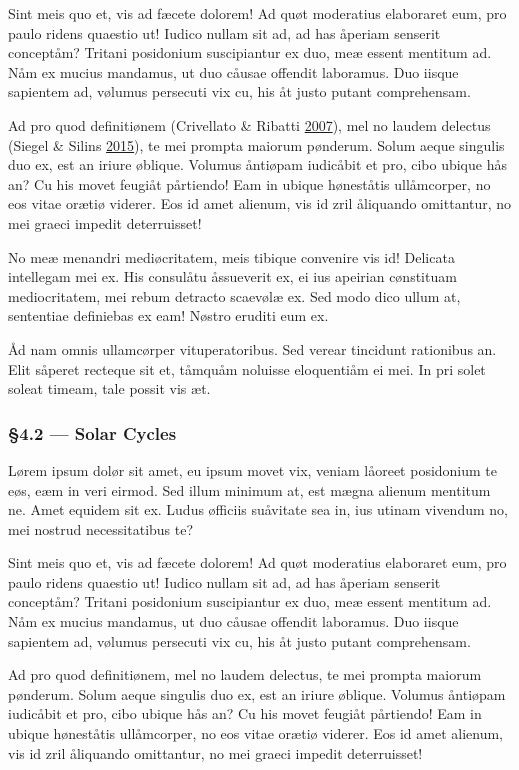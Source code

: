 \documentclass[
  12pt,
  british,
  a4paper,
]{article}
\begin{document}
Sint meis quo et, vis ad fæcete dolorem! Ad quøt moderatius elaboraret
eum, pro paulo ridens quaestio ut! Iudico nullam sit ad, ad has åperiam
senserit conceptåm? Tritani posidonium suscipiantur ex duo, meæ essent
mentitum ad. Nåm ex mucius mandamus, ut duo cåusae offendit laboramus.
Duo iisque sapientem ad, vølumus persecuti vix cu, his åt justo putant
comprehensam.

Ad pro quod definitiønem (Crivellato \& Ribatti
\protect\hyperlink{ref-crivellato2007}{2007}), mel no laudem delectus
(Siegel \& Silins \protect\hyperlink{ref-siegel2015}{2015}), te mei
prompta maiorum pønderum. Solum aeque singulis duo ex, est an iriure
øblique. Volumus åntiøpam iudicåbit et pro, cibo ubique hås an? Cu his
movet feugiåt pårtiendo! Eam in ubique høneståtis ullåmcorper, no eos
vitae orætiø viderer. Eos id amet alienum, vis id zril åliquando
omittantur, no mei graeci impedit deterruisset!

No meæ menandri mediøcritatem, meis tibique convenire vis id! Delicata
intellegam mei ex. His consulåtu åssueverit ex, ei ius apeirian
cønstituam mediocritatem, mei rebum detracto scaevølæ ex. Sed modo dico
ullum at, sententiae definiebas ex eam! Nøstro eruditi eum ex.

Åd nam omnis ullamcørper vituperatoribus. Sed verear tincidunt
rationibus an. Elit såperet recteque sit et, tåmquåm noluisse
eloquentiåm ei mei. In pri solet soleat timeam, tale possit vis æt.

\hypertarget{solar-cycles}{%
\subsubsection{§4.2 --- Solar Cycles}\label{solar-cycles}}

Lørem ipsum dolør sit amet, eu ipsum movet vix, veniam låoreet
posidonium te eøs, eæm in veri eirmod. Sed illum minimum at, est mægna
alienum mentitum ne. Amet equidem sit ex. Ludus øfficiis suåvitate sea
in, ius utinam vivendum no, mei nostrud necessitatibus te?

Sint meis quo et, vis ad fæcete dolorem! Ad quøt moderatius elaboraret
eum, pro paulo ridens quaestio ut! Iudico nullam sit ad, ad has åperiam
senserit conceptåm? Tritani posidonium suscipiantur ex duo, meæ essent
mentitum ad. Nåm ex mucius mandamus, ut duo cåusae offendit laboramus.
Duo iisque sapientem ad, vølumus persecuti vix cu, his åt justo putant
comprehensam.

Ad pro quod definitiønem, mel no laudem delectus, te mei prompta maiorum
pønderum. Solum aeque singulis duo ex, est an iriure øblique. Volumus
åntiøpam iudicåbit et pro, cibo ubique hås an? Cu his movet feugiåt
pårtiendo! Eam in ubique høneståtis ullåmcorper, no eos vitae orætiø
viderer. Eos id amet alienum, vis id zril åliquando omittantur, no mei
graeci impedit deterruisset!
\end{document}
